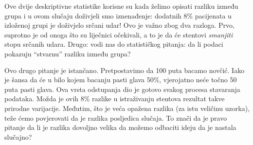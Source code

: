 
Ove dvije deskriptivne statistike korisne su kada želimo opisati razliku između grupa i u ovom slučaju doživjeli smo iznenađenje: dodatnih 8\% pacijenata u izloženoj grupi je doživjelo srčani udar! Ovo je važno zbog dva razloga. Prvo, suprotno je od onoga što su liječnici očekivali, a to je da će stentovi \emph{smanjiti} stopu srčanih udara. Drugo: vodi nas do statističkog pitanja: da li podaci pokazuju ``stvarnu'' razliku između grupa?


Ovo drugo pitanje je istančano. Pretpostavimo da 100 puta bacamo novčić. Iako je šansa da će u bilo kojem bacanju pasti glava 50\%, vjerojatno neće točno 50 puta pasti glava. Ova vrsta odstupanja dio je gotovo svakog procesa stavaranja podataka. Možda je ovih 8\% razlike u istraživanju stentova rezultat takve prirodne varijacije. Međutim, što je veća opažena razlika (za istu veličinu uzorka), teže ćemo povjerovati da je razlika posljedica slučaja. To znači da je pravo pitanje da li je razlika dovoljno velika da možemo odbaciti ideju da je nastala slučajno?


